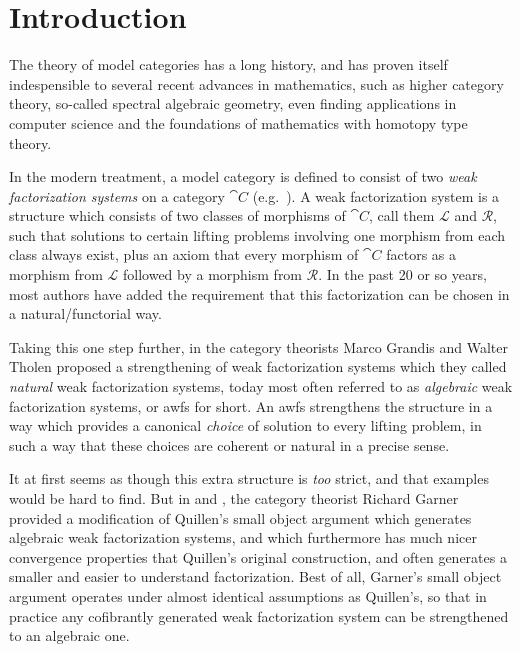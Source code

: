 
\chapter{Introduction}

The theory of model categories has a long history, and has proven itself indespensible to several recent advances in mathematics, such as higher category theory, so-called spectral algebraic geometry, even finding applications in computer science and the foundations of mathematics with homotopy type theory.

In the modern treatment, a model category is defined to consist of two \emph{weak factorization systems} on a category $\cat{C}$ (e.g.~\cite{mp:more-concise}). A weak factorization system is a structure which consists of two classes of morphisms of $\cat{C}$, call them $\mathcal{L}$ and $\mathcal{R}$, such that solutions to certain lifting problems involving one morphism from each class always exist, plus an axiom that every morphism of $\cat{C}$ factors as a morphism from $\mathcal{L}$ followed by a morphism from $\mathcal{R}$. In the past 20 or so years, most authors have added the requirement that this factorization can be chosen in a natural/functorial way.

Taking this one step further, in \cite{gt:nwfs} the category theorists Marco Grandis and Walter Tholen proposed a strengthening of weak factorization systems which they called \emph{natural} weak factorization systems, today most often referred to as \emph{algebraic} weak factorization systems, or awfs for short. An awfs strengthens the structure in a way which provides a canonical \emph{choice} of solution to every lifting problem, in such a way that these choices are coherent or natural in a precise sense.

It at first seems as though this extra structure is \emph{too} strict, and that examples would be hard to find. But in \cite{garner:nwfs} and \cite{garner:soa}, the category theorist Richard Garner provided a modification of Quillen's small object argument which generates algebraic weak factorization systems, and which furthermore has much nicer convergence properties that Quillen's original construction, and often generates a smaller and easier to understand factorization. Best of all, Garner's small object argument operates under almost identical assumptions as Quillen's, so that in practice any cofibrantly generated weak factorization system can be strengthened to an algebraic one.

